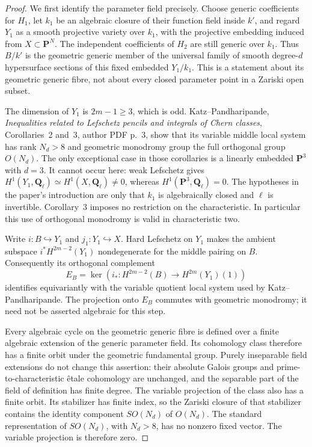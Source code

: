\begin{proof}
We first identify the parameter field precisely. Choose generic
coefficients for $H_1$, let $k_1$ be an algebraic closure of their
function field inside $k'$, and regard $Y_1$ as a smooth projective
variety over $k_1$, with the projective embedding induced from
$X\subset\mathbf P^N$. The independent coefficients of $H_2$ are
still generic over $k_1$. Thus $B/k'$ is the geometric generic member
of the universal family of smooth degree-$d$ hypersurface sections
of this fixed embedded $Y_1/k_1$. This is a statement about its
geometric generic fibre, not about every closed parameter point in
a Zariski open subset.

The dimension of $Y_1$ is $2m-1\ge3$, which is odd.
Katz--Pandharipande, \emph{Inequalities related to Lefschetz pencils
and integrals of Chern classes}, Corollaries~2 and~3, author PDF
p.~3, show that its variable middle local system has rank $N_d>8$
and geometric monodromy group the full orthogonal group $O(N_d)$.
The only exceptional case in those corollaries is a linearly
embedded $\mathbf P^3$ with $d=3$. It cannot occur here:
weak Lefschetz gives
$H^1(Y_1,\mathbf Q_\ell)\simeq H^1(X,\mathbf Q_\ell)\ne0$,
whereas $H^1(\mathbf P^3,\mathbf Q_\ell)=0$.
The hypotheses in the paper's introduction are only that $k_1$ is
algebraically closed and $\ell$ is invertible. Corollary~3 imposes
no restriction on the characteristic. In particular this use of
orthogonal monodromy is valid in characteristic two.

Write $i:B\hookrightarrow Y_1$ and $j_1:Y_1\hookrightarrow X$.
Hard Lefschetz on $Y_1$ makes the ambient subspace
$i^*H^{2m-2}(Y_1)$ nondegenerate for the middle pairing on $B$.
Consequently its orthogonal complement
\[
 E_B=\ker\!\left(i_*:H^{2m-2}(B)
                         \longrightarrow H^{2m}(Y_1)(1)\right)
\]
identifies equivariantly with the variable quotient local system
used by Katz--Pandharipande. The projection onto $E_B$ commutes with
geometric monodromy; it need not be asserted algebraic for this step.

Every algebraic cycle on the geometric generic fibre is defined
over a finite algebraic extension of the generic parameter field.
Its cohomology class therefore has a finite orbit under the
geometric fundamental group. Purely inseparable field extensions
do not change this assertion: their absolute Galois groups and
prime-to-characteristic \^{e}tale cohomology are unchanged, and the
separable part of the field of definition has finite degree.
The variable projection of the class also has a finite orbit.
Its stabilizer has finite index, so the Zariski closure of that
stabilizer contains the identity component $SO(N_d)$ of $O(N_d)$.
The standard representation of $SO(N_d)$, with $N_d>8$, has no
nonzero fixed vector. The variable projection is therefore zero.


\end{proof}

